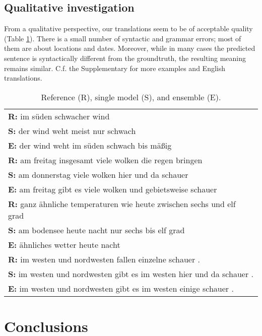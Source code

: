 \documentclass[10pt,twocolumn,letterpaper]{article}
\begin{document}
\subsection{ Qualitative  investigation  }
From a qualitative perspective, our translations seem to be of acceptable quality (Table \ref{tab:exp9}). There is a small number of syntactic and grammar errors; most of them are about locations and dates. Moreover, while in many cases the predicted sentence is syntactically different from the 
groundtruth, the resulting meaning remains similar. C.f. the Supplementary for more examples and English translations.  
\begin{table}[h]
\footnotesize
\begin{center}
\caption{Reference (R), single model (S), and ensemble (E).}
\begin{tabular}{|l|}
\hline
\textbf{R: } im süden schwacher wind\\
\textbf{S: } der wind weht meist nur schwach\\
\textbf{E: } der wind weht im süden schwach bis mäßig\\
\hline
\textbf{R: }  am freitag insgesamt viele wolken die regen bringen\\
\textbf{S: } am donnerstag viele wolken hier und da schauer\\
\textbf{E: } am freitag gibt es viele wolken und gebietsweise schauer\\
\hline
\textbf{R: }ganz ähnliche temperaturen wie heute zwischen sechs und elf grad\\ 
\textbf{S: } am bodensee heute nacht nur sechs bis elf grad\\
\textbf{E: }ähnliches wetter heute nacht\\


\hline
\textbf{R: } im westen und nordwesten fallen einzelne schauer . \\
\textbf{S: } im westen und nordwesten gibt es im westen hier und da schauer . \\
\textbf{E: } im westen und nordwesten gibt es im westen einige schauer .\\


\hline 
\end{tabular}

\label{tab:exp9}
\end{center}

\end{table}


\section{Conclusions}
\label{sec:conclusion}
\end{document}
